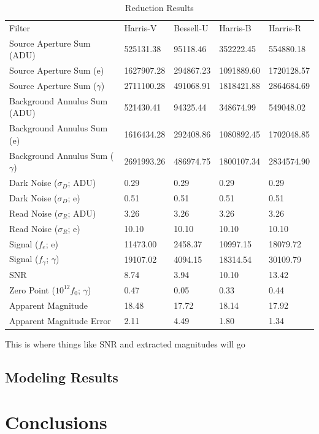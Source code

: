 \documentclass{aastex631}
\begin{document}
\begin{table}
\caption{Reduction Results}
\label{tab:res}
\begin{tabular}{lllll}
Filter & Harris-V & Bessell-U & Harris-B & Harris-R \\
Source Aperture Sum (ADU) & 525131.38 & 95118.46 & 352222.45 & 554880.18 \\
Source Aperture Sum (e) & 1627907.28 & 294867.23 & 1091889.60 & 1720128.57 \\
Source Aperture Sum ($\gamma$) & 2711100.28 & 491068.91 & 1818421.88 & 2864684.69 \\
Background Annulus Sum (ADU) & 521430.41 & 94325.44 & 348674.99 & 549048.02 \\
Background Annulus Sum (e) & 1616434.28 & 292408.86 & 1080892.45 & 1702048.85 \\
Background Annulus Sum ($\gamma$) & 2691993.26 & 486974.75 & 1800107.34 & 2834574.90 \\
Dark Noise ($\sigma_D$; ADU) & 0.29 & 0.29 & 0.29 & 0.29 \\
Dark Noise ($\sigma_D$; e) & 0.51 & 0.51 & 0.51 & 0.51 \\
Read Noise ($\sigma_R$; ADU) & 3.26 & 3.26 & 3.26 & 3.26 \\
Read Noise ($\sigma_R$; e) & 10.10 & 10.10 & 10.10 & 10.10 \\
Signal ($f_e$; e) & 11473.00 & 2458.37 & 10997.15 & 18079.72 \\
Signal ($f_\gamma$; $\gamma$) & 19107.02 & 4094.15 & 18314.54 & 30109.79 \\
SNR & 8.74 & 3.94 & 10.10 & 13.42 \\
Zero Point ($10^{12}f_0$; $\gamma$) & 0.47 & 0.05 & 0.33 & 0.44 \\
Apparent Magnitude & 18.48 & 17.72 & 18.14 & 17.92 \\
Apparent Magnitude Error & 2.11 & 4.49 & 1.80 & 1.34 \\
\end{tabular}
\end{table}


This is where things like SNR and extracted magnitudes will go

\subsection{Modeling Results}

\section{Conclusions}
\end{document}

